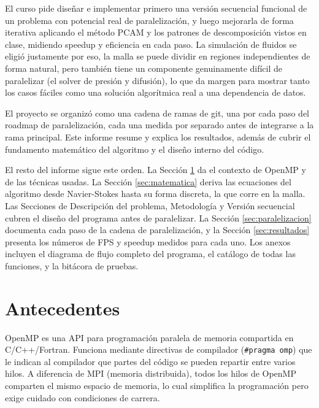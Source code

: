 \documentclass[11pt]{article}
\begin{document}
El curso pide diseñar e implementar primero una versión secuencial
funcional de un problema con potencial real de paralelización, y luego
mejorarla de forma iterativa aplicando el método PCAM y los patrones de
descomposición vistos en clase, midiendo speedup y eficiencia en cada
paso. La simulación de fluidos se eligió justamente por eso, la malla se
puede dividir en regiones independientes de forma natural, pero también
tiene un componente genuinamente difícil de paralelizar (el solver de
presión y difusión), lo que da margen para mostrar tanto los casos
fáciles como una solución algorítmica real a una dependencia de datos.

El proyecto se organizó como una cadena de ramas de git, una por cada
paso del roadmap de paralelización, cada una medida por separado antes
de integrarse a la rama principal. Este informe resume y
explica los resultados, además de cubrir el fundamento
matemático del algoritmo y el diseño interno del código.

El resto del informe sigue este orden. La Sección \ref{sec:antecedentes}
da el contexto de OpenMP y de las técnicas usadas. La Sección
\ref{sec:matematica} deriva las ecuaciones del algoritmo desde
Navier-Stokes hasta su forma discreta, la que corre en la malla. Las
Secciones de Descripción del problema, Metodología y Versión secuencial
cubren el diseño del programa antes de paralelizar. La Sección
\ref{sec:paralelizacion} documenta cada paso de la cadena de
paralelización, y la Sección \ref{sec:resultados} presenta los números
de FPS y speedup medidos para cada uno. Los anexos incluyen el diagrama
de flujo completo del programa, el catálogo de todas las funciones, y la
bitácora de pruebas.

\newpage

\section{Antecedentes}\label{sec:antecedentes}

OpenMP es una API para programación paralela de memoria compartida en
C/C++/Fortran. Funciona mediante directivas de compilador (\texttt{\#pragma
omp}) que le indican al compilador que partes del código se pueden repartir
entre varios hilos. A diferencia de MPI (memoria distribuida), todos los
hilos de OpenMP comparten el mismo espacio de memoria, lo cual simplifica
la programación pero exige cuidado con condiciones de carrera.
\end{document}
